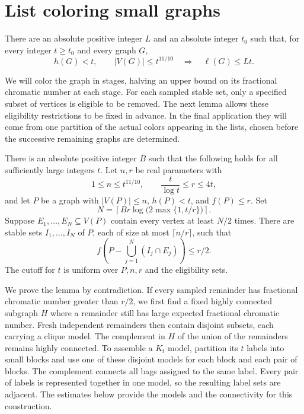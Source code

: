 \section{List coloring small graphs}
\label{small:section}

\begin{proposition}\label{prop:small-list}
There are an absolute positive integer $L$ and an absolute integer $t_0$
such that, for every integer $t\ge t_0$ and every graph $G$,
\[
 h(G)<t,\qquad |V(G)|\le t^{11/10}
 \quad\Longrightarrow\quad \ell(G)\le Lt.
\]
\end{proposition}

We will color the graph in stages, halving an upper bound on its fractional
chromatic number at each stage. For each sampled stable set, only a specified
subset of vertices is eligible to be removed. The next lemma allows
these eligibility restrictions to be fixed in advance. In the final
application they will come from one partition of the actual colors
appearing in the lists, chosen before the successive remaining graphs
are determined.

\begin{lemma}\label{small:eligible-thinning}
There is an absolute positive integer $B$ such that the following holds
for all sufficiently large integers $t$. Let $n,r$ be real parameters with
\[
 1\le n\le t^{11/10},\qquad \frac{t}{\log t}\le r\le4t,
\]
and let $P$ be a graph with $|V(P)|\le n$, $h(P)<t$, and $f(P)\le r$.
Set
\[
 N=\left\lceil Br\log\bigl(2\max\{1,t/r\}\bigr)\right\rceil.
\]
Suppose $E_1,\ldots,E_N\subseteq V(P)$ contain every vertex at least
$N/2$ times. There are stable sets $I_1,\ldots,I_N$ of $P$, each of size
at most $\lceil n/r\rceil$, such that
\[
 f\left(P-\bigcup_{j=1}^N(I_j\cap E_j)\right)\le r/2.
\]
The cutoff for $t$ is uniform over $P,n,r$ and the eligibility sets.
\end{lemma}

We prove the lemma by contradiction. If every sampled remainder has
fractional chromatic number greater than $r/2$, we first find a fixed
highly connected subgraph $H$ where a remainder still has large expected
fractional chromatic number. Fresh independent remainders then contain
disjoint subsets, each carrying a clique model. The complement in $H$
of the union of the remainders remains highly connected. To assemble a
$K_t$ model, partition its $t$ labels into small blocks and use one of
these disjoint models for each
block and each pair of blocks. The complement connects all bags assigned
to the same label. Every pair of labels is represented together in one
model, so the resulting label sets are adjacent. The estimates below
provide the models and the connectivity for this construction.

